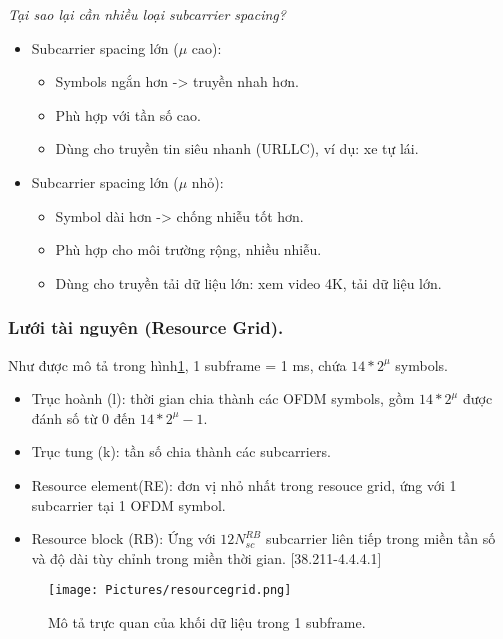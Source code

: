 \textit{Tại sao lại cần nhiều loại subcarrier spacing?}
\begin{itemize}
    \item Subcarrier spacing lớn ($\mu$ cao):
    \begin{itemize}
        \item Symbols ngắn hơn -> truyền nhah hơn.
        \item Phù hợp với tần số cao.
        \item Dùng cho truyền tin siêu nhanh (URLLC), ví dụ: xe tự lái.
    \end{itemize}
    \item Subcarrier spacing lớn ($\mu$ nhỏ):
    \begin{itemize}
        \item Symbol dài hơn -> chống nhiễu tốt hơn.
        \item Phù hợp cho môi trường rộng, nhiều nhiễu.
        \item Dùng cho truyền tải dữ liệu lớn: xem video 4K, tải dữ liệu lớn.
    \end{itemize}
\end{itemize}

\subsubsection{Lưới tài nguyên (Resource Grid).}
Như được mô tả trong hình\ref{regr}, 1 subframe = 1 ms, chứa $14*2^{\mu}$ symbols.
\begin{itemize}
    \item Trục hoành (l): thời gian chia thành các OFDM symbols, gồm $14*2^{\mu}$ được đánh số từ 0 đến $14*2^{\mu} -1$.
    \item Trục tung (k): tần số chia thành các subcarriers.
    \item Resource element(RE): đơn vị nhỏ nhất trong resouce grid, ứng với 1 subcarrier tại 1 OFDM symbol.
    \item Resource block (RB): Ứng với $12N^{RB}_{sc}$ subcarrier liên tiếp trong miền tần số và độ dài tùy chỉnh trong miền thời gian. [38.211-4.4.4.1]
\end{itemize}
\begin{figure}[H]
    \centering
    \texttt{[image: Pictures/resourcegrid.png]}
    \caption{Mô tả trực quan của khối dữ liệu trong 1 subframe.\cite{ShareTechnote_5GNR_nume}}

    \label{regr}
\end{figure}
